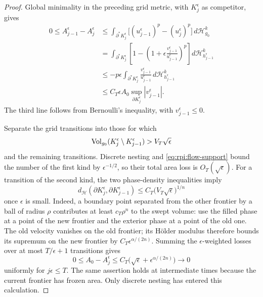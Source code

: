 \begin{proof}
Global minimality in the preceding grid metric, with
$K_j^\epsilon$ as competitor, gives
\[
 \begin{aligned}
 0\le A_{j-1}^\epsilon-A_j^\epsilon
 &\le\int_{\partial^*K_j^\epsilon}
       \bigl[(u_{j-1}^\epsilon)^p-(u_j^\epsilon)^p\bigr]
       \,d\mathcal H^k_{g_0}\\
 &=\int_{\partial^*K_j^\epsilon}
       \left[1-\left(1+
         \epsilon\frac{v_{j-1}^\epsilon}{u_{j-1}^\epsilon}
                    \right)^p\right]d\mathcal H^k_{h_{j-1}^\epsilon}\\
 &\le-p\epsilon\int_{\partial^*K_j^\epsilon}
          \frac{v_{j-1}^\epsilon}{u_{j-1}^\epsilon}
                   \,d\mathcal H^k_{h_{j-1}^\epsilon}\\
 &\le C_T\epsilon A_0
          \sup_{\partial K_j^\epsilon}|v_{j-1}^\epsilon|.
 \end{aligned}
\]
The third line follows from Bernoulli's inequality, with
$v_{j-1}^\epsilon\le0$.

Separate the grid transitions into those for which
\[
 \operatorname{Vol}_{g_0}(K_j^\epsilon\setminus K_{j-1}^\epsilon)
     >V_T\sqrt\epsilon
\]
and the remaining transitions. Discrete nesting and
\eqref{eq:rpi:flow-support} bound the number of the first kind by
$\epsilon^{-1/2}$, so their total area loss is $O_T(\sqrt\epsilon)$.
For a transition of the second kind, the two phase-density
inequalities imply
\[
 d_{\mathcal H}(\partial K_j^\epsilon,
                 \partial K_{j-1}^\epsilon)
 \le C_T\bigl(V_T\sqrt\epsilon\bigr)^{1/n}
\]
once $\epsilon$ is small. Indeed, a boundary point separated from
the other frontier by a ball of radius $\rho$ contributes at least
$c_T\rho^n$ to the swept volume: use the filled phase at a point of
the new frontier and the exterior phase at a point of the old one.
The old velocity vanishes on the old frontier; its H\"older modulus
therefore bounds its supremum on the new frontier by
$C_T\epsilon^{\alpha/(2n)}$. Summing the $\epsilon$-weighted
losses over at most $T/\epsilon+1$ transitions gives
\begin{equation}
\label{eq:rpi:flow-area-loss}
 0\le A_0-A_j^\epsilon
 \le C_T\bigl(\sqrt\epsilon+\epsilon^{\alpha/(2n)}\bigr)
 \longrightarrow0
\end{equation}
uniformly for $j\epsilon\le T$. The same assertion holds at
intermediate times because the current frontier has frozen area.
Only discrete nesting has entered this calculation.

\end{proof}

